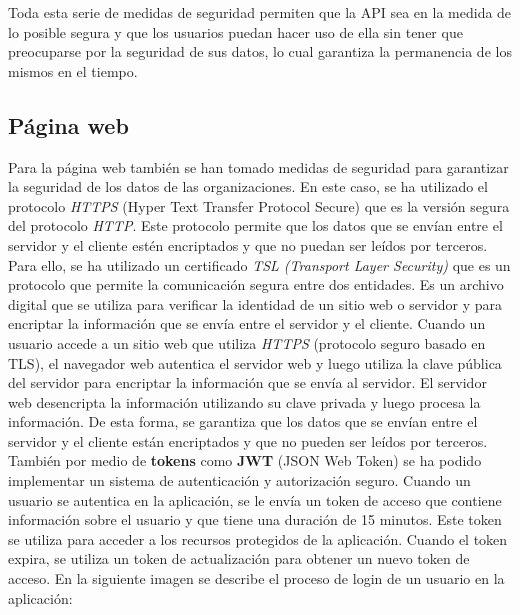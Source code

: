 Toda esta serie de medidas de seguridad permiten que la API sea en la medida de lo posible segura y que los usuarios
puedan hacer uso de ella sin tener que preocuparse por la seguridad de sus datos, lo cual garantiza la permanencia
de los mismos en el tiempo.

\subsection{Página web}\label{subsec:pagina-web}

Para la página web también se han tomado medidas de seguridad para garantizar la seguridad de los datos de las organizaciones.
En este caso, se ha utilizado el protocolo \textit{HTTPS} (Hyper Text Transfer Protocol Secure) que es la versión segura
del protocolo \textit{HTTP}. Este protocolo permite que los datos que se envían entre el servidor y el cliente estén encriptados
y que no puedan ser leídos por terceros. Para ello, se ha utilizado un certificado \textit{TSL (Transport Layer Security)} que
es un protocolo que permite la comunicación segura entre dos entidades. Es un archivo digital que se utiliza para verificar
la identidad de un sitio web o servidor y para encriptar la información que se envía entre el servidor y el cliente.
Cuando un usuario accede a un sitio web que utiliza \textit{HTTPS} (protocolo seguro basado en TLS), el navegador web
autentica el servidor web y luego utiliza la clave pública del servidor para encriptar la información que se envía al
servidor. El servidor web desencripta la información utilizando su clave privada y luego procesa la información. De esta
forma, se garantiza que los datos que se envían entre el servidor y el cliente están encriptados y que no pueden ser
leídos por terceros. \\

También por medio de \textbf{tokens} como \textbf{JWT} (JSON Web Token) se ha podido implementar un sistema de autenticación
y autorización seguro. Cuando un usuario se autentica en la aplicación, se le envía un token de acceso que contiene
información sobre el usuario y que tiene una duración de 15 minutos. Este token se utiliza para acceder a los recursos
protegidos de la aplicación. Cuando el token expira, se utiliza un token de actualización para obtener un nuevo token
de acceso. En la siguiente imagen se describe el proceso de login de un usuario en la aplicación:

